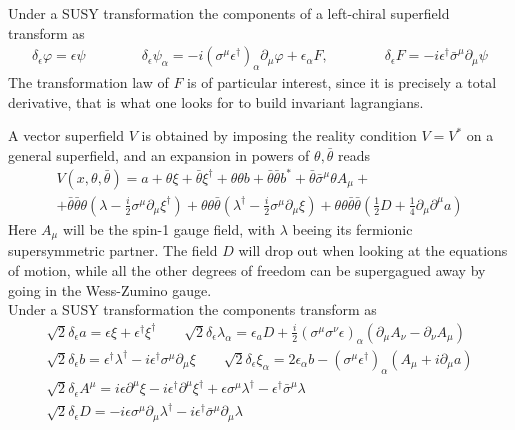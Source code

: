 \documentclass[12pt]{article}
\begin{document}
Under a SUSY transformation the components of a left-chiral superfield transform as 
\begin{gather*}
  \delta_{\epsilon} \varphi =\epsilon \psi \qquad\qquad
  \delta_{\epsilon} \psi_{\alpha} =-i\left(\sigma^{\mu} \epsilon^{\dagger}\right)_{\alpha} \partial_{\mu} \varphi+\epsilon_{\alpha} F, \qquad\qquad
  \delta_{\epsilon} F =-i \epsilon^{\dagger} \bar{\sigma}^{\mu} \partial_{\mu} \psi
\end{gather*}
The transformation law of $F$ is of particular interest, since it is precisely a total derivative, that is what one looks for to build invariant lagrangians. \par
\vspace{15pt}
\raggedright A vector superfield $V$ is obtained by imposing the reality condition $V=V^*$ on a general superfield, and an expansion in powers of $\theta, \bar\theta$ reads
\begin{gather*}
  V\left(x, \theta, \bar\theta\right) = a+\theta \xi+\bar\theta \xi^{\dagger} +\theta \theta b+\bar\theta \bar\theta b^*+\bar\theta \bar{\sigma}^{\mu} \theta A_{\mu}+ \\ 
                + \bar\theta \bar\theta \theta\left(\lambda-\frac{i}{2} \sigma^{\mu} \partial_{\mu} \xi^{\dagger}\right)
                +\theta \theta \bar\theta\left(\lambda^{\dagger}-\frac{i}{2} \sigma^{\mu} \partial_{\mu} \xi\right)+\theta \theta \bar\theta \bar\theta \left(\frac{1}{2} D+\frac{1}{4} \partial_{\mu} \partial^{\mu} a\right)
\end{gather*}
Here $A_\mu$ will be the spin-1 gauge field, with $\lambda$ beeing its fermionic supersymmetric partner. The field $D$ will drop out when looking at the equations of motion, while all the other degrees of freedom can be supergagued away by going in the Wess-Zumino gauge. \\
Under a SUSY transformation the components transform as 
\begin{gather*}
  \sqrt{2} \delta_{\epsilon} a =\epsilon \xi+\epsilon^{\dagger} \xi^{\dagger} \qquad 
  \sqrt{2} \delta_{\epsilon} \lambda_{\alpha} =\epsilon_{a} D+\frac{i}{2}\left(\sigma^{\mu} \sigma^{\nu} \epsilon\right)_{\alpha}\left(\partial_{\mu} A_{\nu}-\partial_{\nu} A_{\mu}\right) \\
  \sqrt{2} \delta_{\epsilon} b =\epsilon^{\dagger} \lambda^{\dagger}-i \epsilon^{\dagger} \sigma^{\mu} \partial_{\mu} \xi \qquad
  \sqrt{2} \delta_{\epsilon} \xi_{\alpha} =2 \epsilon_{\alpha} b-\left(\sigma^{\mu} \epsilon^{\dagger}\right)_{\alpha}\left(A_{\mu}+i \partial_{\mu} a\right) \\
  \sqrt{2} \delta_{\epsilon} A^{\mu} =i \epsilon \partial^{\mu} \xi-i \epsilon^{\dagger} \partial^{\mu} \xi^{\dagger}+\epsilon \sigma^{\mu} \lambda^{\dagger}-\epsilon^{\dagger} \bar{\sigma}^{\mu} \lambda \\
  \sqrt{2} \delta_{\epsilon} D =-i \epsilon \sigma^{\mu} \partial_{\mu} \lambda^{\dagger}-i \epsilon^{\dagger} \bar{\sigma}^{\mu} \partial_{\mu} \lambda
\end{gather*}
\end{document}
